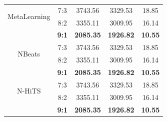 \begin{table}[H]
\begin{tabular}{|c|c|c|c|c|}
         \hline
         \multirow{2}{*}{MetaLearning} & 7:3 & 3743.56&3329.53&18.85\\ & 8:2 & 3355.11&3009.95&16.14 \\ & \textbf{9:1} & \textbf{2085.35} & \textbf{1926.82} & \textbf{10.55}\\
         \hline
         \multirow{2}{*}{NBeats} & 7:3 & 3743.56&3329.53&18.85\\ & 8:2 & 3355.11&3009.95&16.14 \\ & \textbf{9:1} & \textbf{2085.35} & \textbf{1926.82} & \textbf{10.55}\\
         \hline
         \multirow{2}{*}{N-HiTS} & 7:3 & 3743.56&3329.53&18.85\\ & 8:2 & 3355.11&3009.95&16.14 \\ & \textbf{9:1} & \textbf{2085.35} & \textbf{1926.82} & \textbf{10.55}\\
         \hline
    \end{tabular}
    \label{vcbresult}
\end{table}

